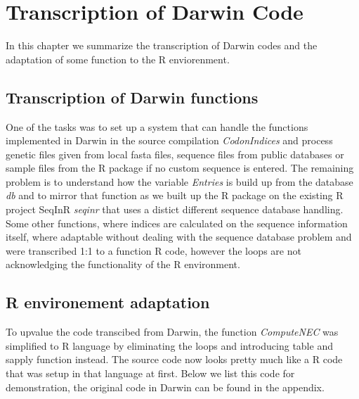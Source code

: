 \chapter{Transcription of Darwin Code}
In this chapter we summarize the transcription of Darwin codes and the adaptation of some function to the R enviorenment.


\section{Transcription of Darwin functions}
One of the tasks was to set up a system that can handle the functions implemented in Darwin in the source compilation \textit{CodonIndices} and process genetic files given from local fasta files, sequence files from public databases or sample files from the R package if no custom sequence is entered. The remaining problem is to understand how the variable \textit{Entries} is build up from the database \textit{db} and to mirror that function as we built up the R package on the existing R project SeqInR \textit{seqinr} that uses a distict different sequence database handling.
Some other functions, where indices are calculated on the sequence information itself, where adaptable without dealing with the sequence database problem and were transcribed 1:1 to a function R code, however the loops are not acknowledging the functionality of the R environment.

\section{R environement adaptation}
To upvalue the code transcibed from Darwin, the function \textit{ComputeNEC} was simplified to R language by eliminating the loops and introducing table and sapply function instead. The source code now looks pretty much like a R code that was setup in that language at first. Below we list this code for demonstration, the original code in Darwin can be found in the appendix.

  